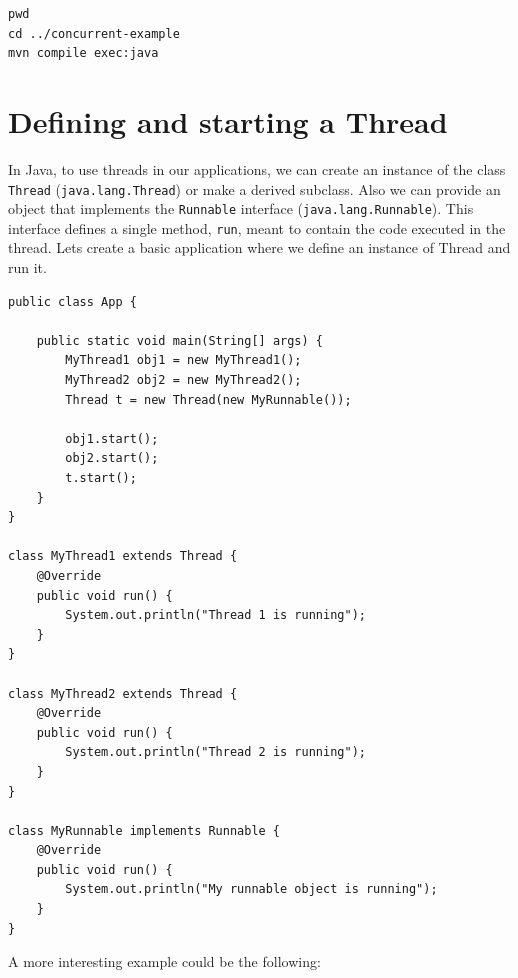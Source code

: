 \documentclass[openany, a4paper]{book}
\theoremstyle{break}
\theoremstyle{example}
\theoremstyle{note}
\theoremstyle{break}
\theoremstyle{exercise}
\begin{document}
\begin{verbatim}
pwd
cd ../concurrent-example
mvn compile exec:java
\end{verbatim}


\section{Defining and starting a Thread}
\label{sec:orgb2251d1}

In Java, to use threads in our applications, we can create an instance of
the class \texttt{Thread} (\texttt{java.lang.Thread}) or make a derived subclass. Also we can
provide an object that implements the \texttt{Runnable} interface
(\texttt{java.lang.Runnable}). This interface defines a single method, \texttt{run}, meant to
contain the code executed in the thread. Lets create a basic application
where we define an instance of Thread and run it.

\begin{verbatim}
public class App {

    public static void main(String[] args) {
        MyThread1 obj1 = new MyThread1();
        MyThread2 obj2 = new MyThread2();
        Thread t = new Thread(new MyRunnable());

        obj1.start();
        obj2.start();
        t.start();
    }
}

class MyThread1 extends Thread {
    @Override
    public void run() {
        System.out.println("Thread 1 is running");
    }
}

class MyThread2 extends Thread {
    @Override
    public void run() {
        System.out.println("Thread 2 is running");
    }
}

class MyRunnable implements Runnable {
    @Override
    public void run() {
        System.out.println("My runnable object is running");
    }
}
\end{verbatim}

A more interesting example could be the following:
\end{document}
